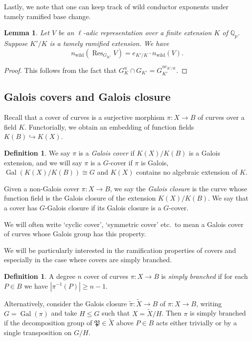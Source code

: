 \documentclass[12pt]{amsart}
\newtheorem{lemma}[theorem]{Lemma}
\theoremstyle{definition}
\newtheorem{definition}[theorem]{Definition}
\theoremstyle{remark}
\newcommand{\QQ}{\mathbb{Q}}
\DeclareMathOperator{\Res}{Res}
\DeclareMathOperator{\Gal}{Gal}
\DeclareMathOperator{\wild}{wild}
\newcommand{\PP}{\mathfrak{P}}
\renewcommand{\tilde}{\widetilde}
\begin{document}
Lastly, we note that one can keep track of wild conductor exponents under tamely ramified base change.

\begin{lemma}\label{lem:TameExtension}
    Let $V$ be an $\ell$-adic representation over a finite extension $K$ of $\QQ_p$. Suppose $K'/K$ is a tamely ramified extension. We have
    \[ n_{\wild}(\Res_{G_{K'}}V) = e_{K'/K}\cdot n_{\wild}(V). \]
\end{lemma}

\begin{proof}
    This follows from the fact that $G_K^u \cap G_{K'}=G_{K'}^{ue_{K'/K}}$.
\end{proof}

\subsection{Galois covers and Galois closure}
Recall that a cover of curves is a surjective morphism $\pi: X\to B$ of curves over a field $K$. Functorially, we obtain an embedding of function fields $K(B)\hookrightarrow K(X)$.

\begin{definition}
    We say $\pi$ is a \textit{Galois cover} if $K(X)/K(B)$ is a Galois extension, and we will say $\pi$ is a $G$-cover if $\pi$ is Galois, $\Gal(K(X)/K(B))\cong G$ and $K(X)$ contains no algebraic extension of $K$.

    Given a non-Galois cover $\pi: X\to B$, we say the \textit{Galois closure} is the curve whose function field is the Galois closure of the extension $K(X)/K(B)$. We say that a cover has $G$-Galois closure if its Galois closure is a $G$-cover.
\end{definition}

We will often write `cyclic cover', `symmetric cover' etc.\ to mean a Galois cover of curves whose Galois group has this property.

We will be particularly interested in the ramification properties of covers and especially in the case where covers are simply branched.

\begin{definition}\label{def:simp}
    A degree $n$ cover of curves $\pi:X\to B$ is \textit{simply branched} if for each $P\in B$ we have $|\pi^{-1}(P)|\ge n-1$. 
    
    Alternatively, consider the Galois closure $\tilde{\pi}:\tilde{X}\to B$ of $\pi: X\to B$, writing $G=\Gal(\pi)$ and take $H\le G$ such that $X=\tilde{X}/H$. Then $\pi$ is simply branched if the decomposition group of $\PP\in \tilde{X}$ above $P\in B$ acts either trivially or by a single transposition on $G/H$.
\end{definition}
\end{document}
